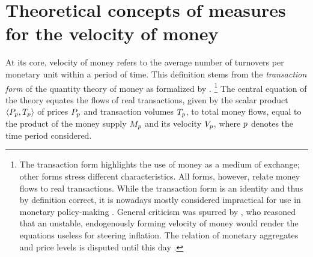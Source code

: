 \section{Theoretical concepts of measures for the velocity of money}
\label{sec:concepts}


At its core, velocity of money refers to the average number of turnovers per
monetary unit within a period of time. %
This definition stems from the \emph{transaction form} of the quantity theory
of money as formalized by \cite{fisher1911equation}.%
\footnote{
  The transaction form highlights the use of money as a medium of exchange; %
  other forms stress different characteristics.  All forms, however, relate %
  money flows to real transactions. %
  While the transaction form is an identity and thus by definition correct, %
  it is nowadays mostly considered impractical for use in monetary %
  policy-making \citep[cf.][]{friedman2017quantity}. %
  General criticism was spurred by \cite{keynes2018general, tobin1989money, hansen1957american}, who reasoned that an unstable, %
  endogenously forming velocity of money would render the equations useless %
  for steering inflation. %
  The relation of monetary aggregates and price levels is disputed until this day \citep[cf.][]{dwyer1988money, mccallum2001monetary, gali2002new, bachmeier2005predicting, favara2009reconsidering}. 
}
%
The central equation of the theory equates the flows of real transactions,
given by the scalar product $\langle{P_{p}},{T_{p}}\rangle$ of prices ${P_{p}}$ and
transaction volumes ${T_{p}}$, to total money flows, equal to the product of the
money supply ${M_{p}}$ and its velocity \({V_{p}}\), where \({p}\) denotes the time
period considered. %
